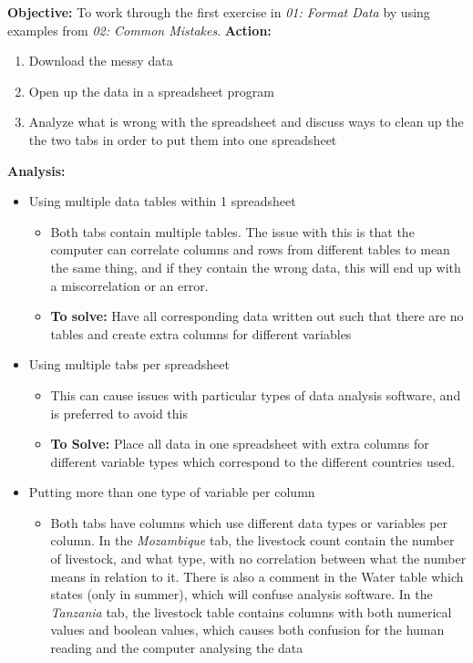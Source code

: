 \documentclass{article}
\begin{document}
\textbf{Objective:} To work through the first exercise in \textit{01: Format Data} by using examples from \textit{02: Common Mistakes}.
\newline
\textbf{Action:}
\begin{enumerate}
    \item Download the messy data
    \item Open up the data in a spreadsheet program
    \item Analyze what is wrong with the spreadsheet and discuss ways to clean up the the two tabs in order to put them into one spreadsheet
\end{enumerate}
\textbf{Analysis:}
\begin{itemize}
    \item Using multiple data tables within 1 spreadsheet
    \begin{itemize}
        \item Both tabs contain multiple tables. The issue with this is that the computer can correlate columns and rows from different tables to mean the same thing, and if they contain the wrong data, this will end up with a miscorrelation or an error.
        \item \textbf{To solve:} Have all corresponding data written out such that there are no tables and create extra columns for different variables
    \end{itemize}
    \item Using multiple tabs per spreadsheet
    \begin{itemize}
        \item This can cause issues with particular types of data analysis software, and is preferred to avoid this
        \item \textbf{To Solve:} Place all data in one spreadsheet with extra columns for different variable types which correspond to the different countries used.
    \end{itemize}
    \item Putting more than one type of variable per column
    \begin{itemize}
        \item Both tabs have columns which use different data types or variables per column. In the \textit{Mozambique} tab, the livestock count contain the number of livestock, and what type, with no correlation between what the number means in relation to it. There is also a comment in the Water table which states (only in summer), which will confuse analysis software. In the \textit{Tanzania} tab, the livestock table contains columns with both numerical values and boolean values, which causes both confusion for the human reading and the computer analysing the data

\end{itemize}
\end{itemize}
\end{document}
